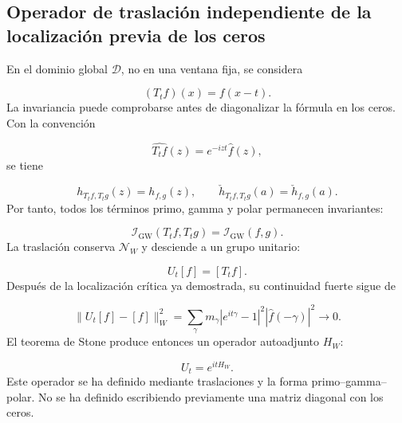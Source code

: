 \subsection{Operador de traslación independiente de la localización previa de los ceros}
En el dominio global \(\mathcal D\), no en una ventana fija, se considera\par
\[
(T_tf)(x)=f(x-t).
\]
La invariancia puede comprobarse antes de diagonalizar la fórmula en los ceros. Con la convención\par
\[
\widehat{T_tf}(z)
=
e^{-izt}\widehat f(z),
\]
se tiene\par
\[
h_{T_tf,T_tg}(z)=h_{f,g}(z),
\qquad
\check h_{T_tf,T_tg}(a)=\check h_{f,g}(a).
\]
Por tanto, todos los términos primo, gamma y polar permanecen invariantes:\par
\[
\mathscr I_{\mathrm{GW}}(T_tf,T_tg)
=
\mathscr I_{\mathrm{GW}}(f,g).
\]
La traslación conserva \(\mathcal N_W\) y desciende a un grupo unitario:\par
\[
U_t[f]=[T_tf].
\]
Después de la localización crítica ya demostrada, su continuidad fuerte sigue de\par
\[
\|U_t[f]-[f]\|_W^2
=
\sum_\gamma
m_\gamma
\left|e^{it\gamma}-1\right|^2
\left|\widehat f(-\gamma)\right|^2
\longrightarrow0.
\]
El teorema de Stone produce entonces un operador autoadjunto \(H_W\):\par
\[
U_t=e^{itH_W}.
\]
Este operador se ha definido mediante traslaciones y la forma primo–gamma–polar. No se ha definido escribiendo previamente una matriz diagonal con los ceros.\par
{}
